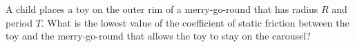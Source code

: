A child places a toy on the outer rim of a merry-go-round that has
radius $R$ and period $T$. What is the lowest value of the
coefficient of static friction between the toy and the merry-go-round that
allows the toy to stay on the carousel?\answercheck
